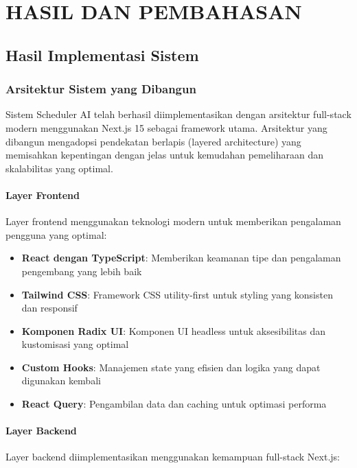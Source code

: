 \chapter{HASIL DAN PEMBAHASAN}
\thispagestyle{plain}

\section{Hasil Implementasi Sistem}

\subsection{Arsitektur Sistem yang Dibangun}

Sistem Scheduler AI telah berhasil diimplementasikan dengan arsitektur full-stack modern menggunakan Next.js 15 sebagai framework utama. Arsitektur yang dibangun mengadopsi pendekatan berlapis (layered architecture) yang memisahkan kepentingan dengan jelas untuk kemudahan pemeliharaan dan skalabilitas yang optimal.

\subsubsection{Layer Frontend}

Layer frontend menggunakan teknologi modern untuk memberikan pengalaman pengguna yang optimal:

\begin{itemize}
\item \textbf{React dengan TypeScript}: Memberikan keamanan tipe dan pengalaman pengembang yang lebih baik
\item \textbf{Tailwind CSS}: Framework CSS utility-first untuk styling yang konsisten dan responsif
\item \textbf{Komponen Radix UI}: Komponen UI headless untuk aksesibilitas dan kustomisasi yang optimal
\item \textbf{Custom Hooks}: Manajemen state yang efisien dan logika yang dapat digunakan kembali
\item \textbf{React Query}: Pengambilan data dan caching untuk optimasi performa
\end{itemize}

\subsubsection{Layer Backend}

Layer backend diimplementasikan menggunakan kemampuan full-stack Next.js:

